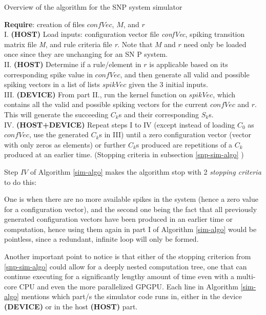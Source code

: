 \documentclass{acm_proc_article-sp}
\begin{document}
\begin{algorithm}
\caption{Overview of the algorithm for the SNP system
simulator}
\label{sim-algo}
\begin{algorithmic}
\textbf{Require}: creation of files $confVec$, $M$, and $r$\\

I. \textbf{(HOST)} Load inputs: configuration vector
file \textit{confVec}, spiking transition matrix
file \textit{M}, and rule criteria file \textit{r}.
Note that $M$ and $r$ need only be loaded 
once since they are unchanging for an SN P system.\\


II. \textbf{(HOST)} Determine if a rule/element in $r$ 
is applicable based on its corresponding spike value 
in $confVec$, and then generate all valid and
possible spiking vectors in a list of lists $spikVec$ given the 3 initial inputs.\\


III. \textbf{(DEVICE)} From part II., run the kernel 
function on $spikVec$, which contains all 
the valid and possible spiking vectors for 
the current $confVec$ and $r$. This will 
generate the succeeding $C_k$s and their corresponding $S_k$s.\\


IV. \textbf{(HOST+DEVICE)} Repeat steps I to IV (except instead of loading $C_0$ as $confVec$, use the generated $C_k$s in III) until
a zero configuration vector (vector with 
only zeros as elements) or further $C_k$s
produced are repetitions of a $C_k$
produced at an earlier time. (Stopping criteria in subsection \ref{snp-sim-algo} )
\end{algorithmic}
\end{algorithm}

	
Step $IV$ of Algorithm \ref{sim-algo} makes
the algorithm stop with 2 \textit{stopping criteria} to do this:

One is when there are no more available spikes in the system (hence a
zero value for a configuration vector), and the second one
being the fact that all previously generated configuration
vectors have been produced in an earlier time or
computation, hence using them again in part I of Algorithm \ref{sim-algo} would be pointless, since a
redundant, infinite loop will only be formed.

Another
important point to notice is that either of the stopping
criterion from \ref{snp-sim-algo} could allow for a deeply nested computation tree,
one that can continue executing for a significantly lengthy amount of
time even with a multi-core CPU and even the more parallelized
GPGPU.
Each line in Algorithm \ref{sim-algo} mentions
which part/s the simulator code runs in, either in the device \textbf{(DEVICE)} or in the host \textbf{(HOST)} part.
\end{document}
